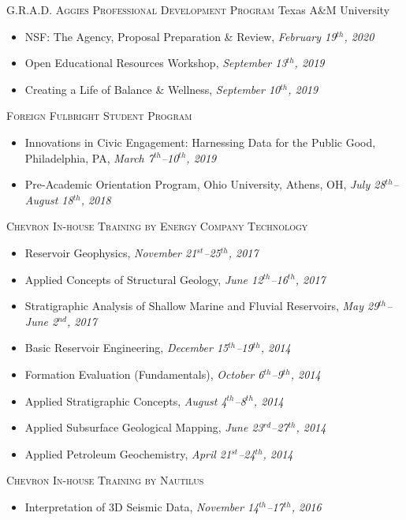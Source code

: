 \documentclass[10pt, letter]{article}
\begin{document}
\bigskip
\textsc{G.R.A.D. Aggies Professional Development Program} \hfill Texas A\&M University
\begin{itemize}[leftmargin=*]
    \item[] NSF: The Agency, Proposal Preparation \& Review, \textit{February 19$^{th}$, 2020}
    \item[] Open Educational Resources Workshop, \textit{September 13$^{th}$, 2019}
    \item[] Creating a Life of Balance \& Wellness, \textit{September 10$^{th}$, 2019}
\end{itemize} 

\bigskip
\textsc{Foreign Fulbright Student Program}
\begin{itemize}[leftmargin=*]
    \item[] Innovations in Civic Engagement: Harnessing Data for the Public Good, Philadelphia, PA, \textit{March 7$^{th}$–10$^{th}$, 2019}
    \item[] Pre-Academic Orientation Program, Ohio University, Athens, OH, \textit{July 28$^{th}$–August 18$^{th}$, 2018}
\end{itemize} 

\bigskip
\textsc{Chevron In-house Training by Energy Company Technology}
\begin{itemize}[leftmargin=*]
    \item[] Reservoir Geophysics, \textit{November 21$^{st}$–25$^{th}$, 2017}
    \item[] Applied Concepts of Structural Geology, \textit{June 12$^{th}$–16$^{th}$, 2017}
    \item[] Stratigraphic Analysis of Shallow Marine and Fluvial Reservoirs, \textit{May 29$^{th}$–June 2$^{nd}$, 2017} 
    \item[] Basic Reservoir Engineering, \textit{December 15$^{th}$–19$^{th}$, 2014}
    \item[] Formation Evaluation (Fundamentals), \textit{October 6$^{th}$–9$^{th}$, 2014}
    \item[] Applied Stratigraphic Concepts, \textit{August 4$^{th}$–8$^{th}$, 2014}
    \item[] Applied Subsurface Geological Mapping, \textit{June 23$^{rd}$–27$^{th}$, 2014}
    \item[] Applied Petroleum Geochemistry, \textit{April 21$^{st}$–24$^{th}$, 2014}
\end{itemize} 

\bigskip
\textsc{Chevron In-house Training by Nautilus}
\begin{itemize}[leftmargin=*]
    \item[] Interpretation of 3D Seismic Data, \textit{November 14$^{th}$–17$^{th}$, 2016}
\end{itemize} 
\end{document}
